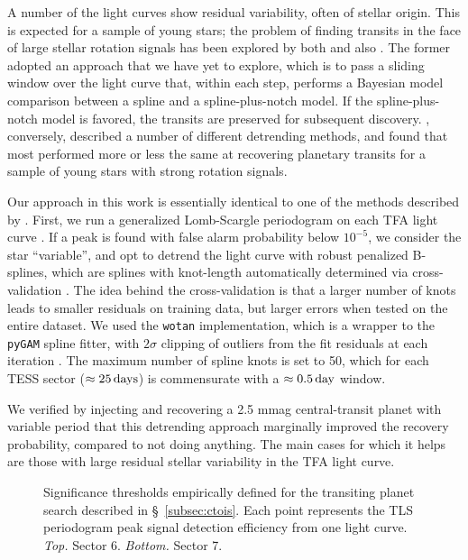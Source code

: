\documentclass[12pt,twocolumn,tighten]{aastex62}
\begin{document}
A number of the light curves show residual variability, often of stellar 
origin.
This is expected for a sample of young stars; the problem of finding transits in 
the face of large stellar rotation signals 
has been explored by both \citet{rizzuto_zeitV_2017} and also 
\citet{hippke_wotan_2019}.
The former adopted an approach that we have yet to explore, which is to 
pass a sliding window over the light curve that, within each step, performs a 
Bayesian model comparison between a spline and a spline-plus-notch model.  If 
the spline-plus-notch model is favored, the transits are preserved for 
subsequent discovery.
\citet{hippke_wotan_2019}, conversely, described a number of different
detrending methods, and found that most performed more or less the same at 
recovering planetary transits for a sample of young stars with strong rotation 
signals.

Our approach in this work is essentially identical to one of the methods 
described by \citet{hippke_wotan_2019}.
First, we run a generalized Lomb-Scargle periodogram on each TFA light 
curve \citep{lomb_1976,scargle_studies_1982,vanderplas_periodograms_2015}.
If a peak is found with false alarm probability below $10^{-5}$, we consider 
the star ``variable'', and opt to 
detrend the light curve with robust penalized B-splines, which are splines 
with knot-length automatically determined via cross-validation 
\citep{eilers_flexible_1996}. The idea behind the cross-validation is that a 
larger  number of knots leads to smaller residuals on training data, but 
larger errors 
when tested on the entire dataset.
We used the \texttt{wotan} implementation, which is a wrapper to the 
\texttt{pyGAM} spline fitter, with $2\sigma$ clipping of outliers from the fit 
residuals at each iteration 
\citep{serven_pygam_2018_1476122,hippke_wotan_2019}.
The maximum number of spline knots is set to 50, which for each TESS sector 
($\approx 25\,{\rm days}$) is commensurate with a $\approx0.5\,{\rm day}$ 
window.

We verified by injecting and recovering a 2.5 mmag central-transit planet
with variable period that this detrending approach marginally improved
the recovery probability, compared to not doing anything.
The main cases for which it helps are those with large residual stellar
variability in the TFA light curve.

\begin{figure}[!t]
    \vspace{-0.8cm}
    \caption{
        Significance thresholds empirically defined for the transiting planet 
        search described in \S~\ref{subsec:ctois}. Each point represents the 
        TLS periodogram peak signal detection efficiency from one light curve.
        {\it Top.} Sector 6.  {\it Bottom.} Sector 7.
    }
    \label{fig:tlsresults}
\end{figure}
\end{document}
